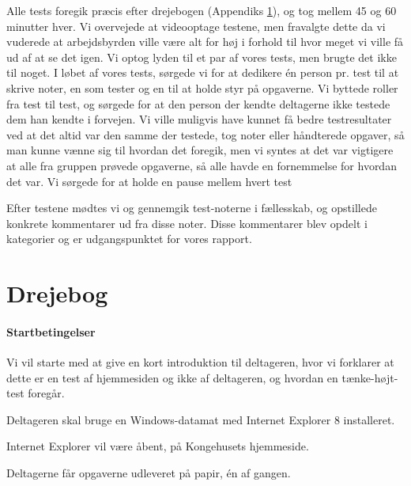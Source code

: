 \documentclass[10pt,a4paper]{article}      %
\begin{document}
Alle tests foregik præcis efter drejebogen (Appendiks \ref{apx:drejebog}), og tog mellem 45 og 60 minutter hver.
Vi overvejede at videooptage testene, men fravalgte dette da vi vuderede at arbejdsbyrden ville være alt for høj i forhold til hvor meget vi ville få ud af at se det igen. Vi optog lyden til et par af vores tests, men brugte det ikke til noget.
I løbet af vores tests, sørgede vi for at dedikere én person pr. test
til at skrive noter, en som tester og en til at holde styr på opgaverne.
Vi byttede roller fra test til test, og sørgede for at den person der
kendte deltagerne ikke testede dem han kendte i forvejen. Vi ville muligvis have kunnet få bedre testresultater ved at det altid var den samme der testede, tog noter eller håndterede opgaver, så man kunne vænne sig til hvordan det foregik, men vi syntes at det var vigtigere at alle fra gruppen prøvede opgaverne, så alle havde en fornemmelse for hvordan det var.
Vi sørgede for at holde en pause mellem hvert test 

Efter testene mødtes vi og gennemgik test-noterne i fællesskab, og opstillede konkrete kommentarer ud fra disse noter. Disse kommentarer blev opdelt i kategorier og er udgangspunktet for vores rapport.


\section{Drejebog}
\label{apx:drejebog}

\paragraph{Startbetingelser}
\begin{opgaver}
\item Vi vil starte med at give en kort introduktion til deltageren, hvor vi
forklarer at dette er en test af hjemmesiden og ikke af deltageren, og hvordan
en tænke-højt-test foregår.
\item Deltageren skal bruge en Windows-datamat med Internet Explorer 8
installeret.
\item Internet Explorer vil være åbent, på Kongehusets hjemmeside.
\item Deltagerne får opgaverne udleveret på papir, én af gangen.
\end{opgaver}
\end{document}
